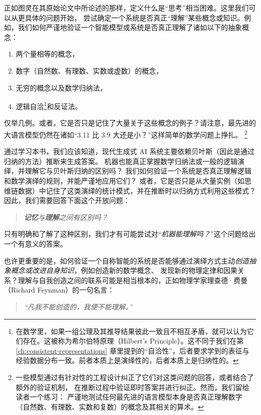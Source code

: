 \documentclass[../../book-main_zh.tex]{subfiles}
\begin{document}
正如图灵在其原始论文中所论述的那样，定义什么是“思考”相当困难。这里我们可以从更具体的问题开始，
尝试确定一个系统是否真正“理解”某些概念或知识。例如，我们如何严谨地验证一个智能模型或系统是否真正理解了诸如以下的抽象概念：
\begin{enumerate}
    \item 两个量相等的概念，
    \item 数字（自然数、有理数、实数或虚数）的概念，
    \item 无穷的概念以及数学归纳法，
    \item 逻辑自洽\footnote{在数学里，如果一组公理及其推导结果彼此一致且不相互矛盾，就可以认为它们存在。这被称为希尔伯特原理（Hilbert's Principle）。这不同于我们在第\ref{ch:consistent-representations}
    章里提到的“自洽性”，后者要求学到的表征与经验数据分布一致。前者本质上是演绎性的，后者本质上是归纳性的。}和反证法。
\end{enumerate}
仅举几例。或者，它是否只是记住了大量关于这些概念的例子？请注意，最先进的大语言模型仍然在诸如“3.11 比 3.9 大还是小？”这样简单的数学问题上挣扎。
\footnote{一些模型通过有针对性的工程设计纠正了它们对这类问题的回答，或者结合了额外的验证机制，
在推断过程中验证即时答案并进行纠正。然而，我们留给读者一个练习：
严谨地测试任何最先进的语言模型本身是否真正理解数字（自然数、有理数、实数和复数）的概念及其相关的算术。}

通过学习本书，我们应该知道，现代生成式 AI 系统主要依赖贝叶斯（因此是通过归纳的方法）推断来生成答案。
机器也能真正掌握数学归纳法或一般的逻辑演绎，并理解它与贝叶斯归纳的区别吗？
我们如何验证一个系统是否真正理解逻辑和数学演绎的规则，并能严谨地应用它们？
或者，它是否只是从大量实例（如思维链数据）中记住了这类演绎的统计模式，并在推断时以归纳方式利用这些模式？
因此，我们需要回答下面这个开放问题：
\begin{quote}
    \centering
    \textit{\textbf{记忆}与\textbf{理解}之间有区别吗？}
\end{quote}
只有明确和了解了这种区别，我们才有可能尝试对“{\em 机器能理解吗？}”这个问题给出一个有意义的答案。

也许更重要的是，如何验证一个自称智能的系统是否能够通过演绎方式主动{\em 创造抽象概念或改进自身知识}，例如创造新的数学概念、
发现新的物理定律和因果关系？理解与自我创造之间的联系可能是相当根本的，正如物理学家理查德·费曼（Richard Feynman）的一句名言：
\begin{quote}
    \centering
    \textit{“凡我不能创造的，我便不能理解。”}
\end{quote}
\end{document}
